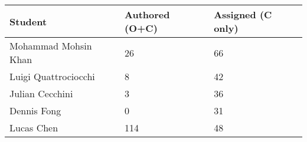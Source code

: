 \documentclass{article}
\begin{document}

\begin{table}[H]
\centering
\begin{tabular}{lll}
\toprule
\textbf{Student} & \textbf{Authored (O+C)} & \textbf{Assigned (C only)}\\
\midrule
Mohammad Mohsin Khan & 26 & 66 \\
Luigi Quattrociocchi & 8 & 42 \\
Julian Cecchini & 3 & 36 \\
Dennis Fong & 0 & 31 \\
Lucas Chen & 114 & 48 \\
\bottomrule
\end{tabular}
\end{table}


\end{document}
